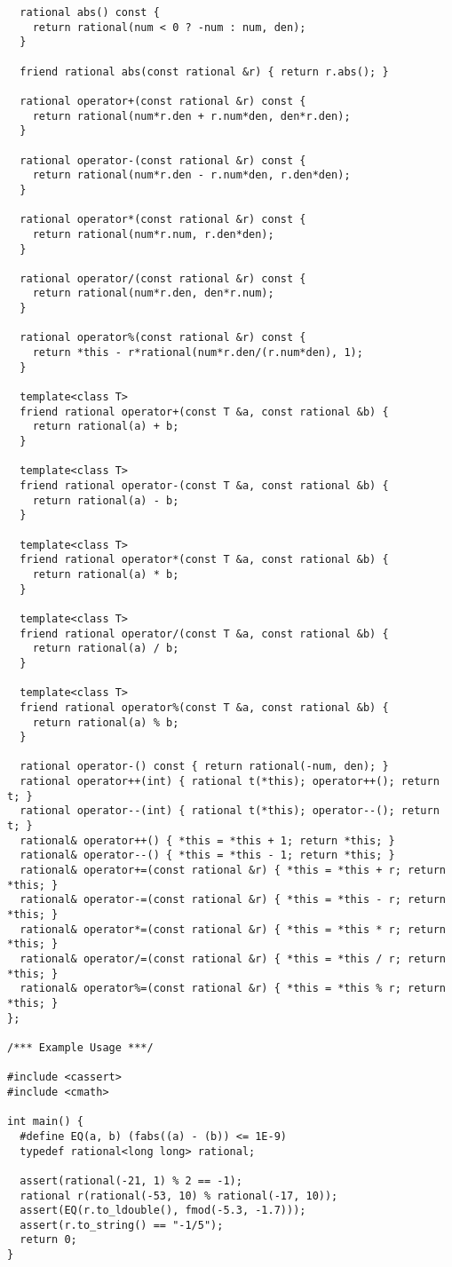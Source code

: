\begin{lstlisting}
  rational abs() const {
    return rational(num < 0 ? -num : num, den);
  }

  friend rational abs(const rational &r) { return r.abs(); }

  rational operator+(const rational &r) const {
    return rational(num*r.den + r.num*den, den*r.den);
  }

  rational operator-(const rational &r) const {
    return rational(num*r.den - r.num*den, r.den*den);
  }

  rational operator*(const rational &r) const {
    return rational(num*r.num, r.den*den);
  }

  rational operator/(const rational &r) const {
    return rational(num*r.den, den*r.num);
  }

  rational operator%(const rational &r) const {
    return *this - r*rational(num*r.den/(r.num*den), 1);
  }

  template<class T>
  friend rational operator+(const T &a, const rational &b) {
    return rational(a) + b;
  }

  template<class T>
  friend rational operator-(const T &a, const rational &b) {
    return rational(a) - b;
  }

  template<class T>
  friend rational operator*(const T &a, const rational &b) {
    return rational(a) * b;
  }

  template<class T>
  friend rational operator/(const T &a, const rational &b) {
    return rational(a) / b;
  }

  template<class T>
  friend rational operator%(const T &a, const rational &b) {
    return rational(a) % b;
  }

  rational operator-() const { return rational(-num, den); }
  rational operator++(int) { rational t(*this); operator++(); return t; }
  rational operator--(int) { rational t(*this); operator--(); return t; }
  rational& operator++() { *this = *this + 1; return *this; }
  rational& operator--() { *this = *this - 1; return *this; }
  rational& operator+=(const rational &r) { *this = *this + r; return *this; }
  rational& operator-=(const rational &r) { *this = *this - r; return *this; }
  rational& operator*=(const rational &r) { *this = *this * r; return *this; }
  rational& operator/=(const rational &r) { *this = *this / r; return *this; }
  rational& operator%=(const rational &r) { *this = *this % r; return *this; }
};

/*** Example Usage ***/

#include <cassert>
#include <cmath>

int main() {
  #define EQ(a, b) (fabs((a) - (b)) <= 1E-9)
  typedef rational<long long> rational;

  assert(rational(-21, 1) % 2 == -1);
  rational r(rational(-53, 10) % rational(-17, 10));
  assert(EQ(r.to_ldouble(), fmod(-5.3, -1.7)));
  assert(r.to_string() == "-1/5");
  return 0;
}
\end{lstlisting}

